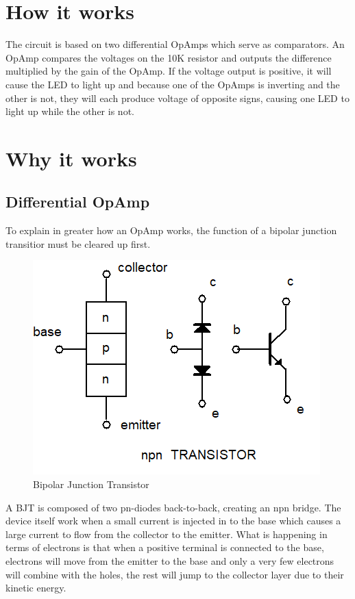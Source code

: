 \documentclass{article}
\begin{document}
	\section{How it works}
	The circuit is based on two differential OpAmps which serve as comparators.
	An OpAmp compares the voltages on the 10K resistor	and outputs the difference 
	multiplied by the gain of the OpAmp. If the	voltage output is positive, it will cause
 	the LED to light up and because one of the OpAmps is inverting and the other is not,
	they will each produce voltage of opposite signs, causing one LED to light up while the other is not.

	\section{Why it works}
	\subsection{Differential OpAmp}

	To explain in greater how an OpAmp works, the function of a bipolar junction transitior
	must be cleared up first.

	\begin{figure}[H]
		\centering
		\includegraphics{bjt}
		\caption{Bipolar Junction Transistor}
	\end{figure}

	A BJT is composed of two pn-diodes back-to-back, creating an npn bridge.
	The device itself work when a small current is injected in to the base
	which causes a large current to flow from the collector to the emitter.
	What is happening in terms of electrons is that when a positive terminal
	is connected to the base, electrons will move from the emitter to the base
	and only a very few electrons will combine with the holes, the rest will
	jump to the collector layer due to their kinetic energy.
\end{document}
